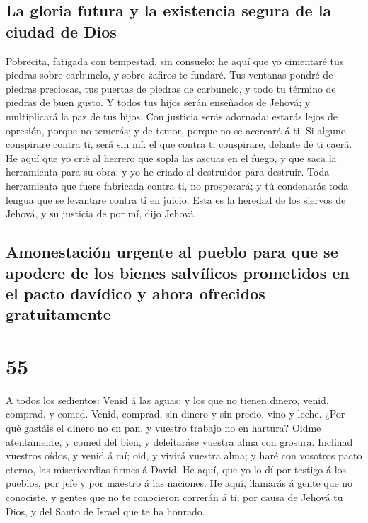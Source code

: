 \hypertarget{la-gloria-futura-y-la-existencia-segura-de-la-ciudad-de-dios}{%
\subsection{La gloria futura y la existencia segura de la ciudad de
Dios}\label{la-gloria-futura-y-la-existencia-segura-de-la-ciudad-de-dios}}

 Pobrecita, fatigada con tempestad, sin consuelo; he aquí
que yo cimentaré tus piedras sobre carbunclo, y sobre zafiros te
fundaré.  Tus ventanas pondré de piedras preciosas, tus
puertas de piedras de carbunclo, y todo tu término de piedras de buen
gusto.  Y todos tus hijos serán enseñados de Jehová; y
multiplicará la paz de tus hijos.  Con justicia serás
adornada; estarás lejos de opresión, porque no temerás; y de temor,
porque no se acercará á ti.  Si alguno conspirare contra
ti, será sin mí: el que contra ti conspirare, delante de ti caerá.
 He aquí que yo crié al herrero que sopla las ascuas en
el fuego, y que saca la herramienta para su obra; y yo he criado al
destruidor para destruir.  Toda herramienta que fuere
fabricada contra ti, no prosperará; y tú condenarás toda lengua que se
levantare contra ti en juicio. Esta es la heredad de los siervos de
Jehová, y su justicia de por mí, dijo Jehová.

\hypertarget{amonestaciuxf3n-urgente-al-pueblo-para-que-se-apodere-de-los-bienes-salvuxedficos-prometidos-en-el-pacto-davuxeddico-y-ahora-ofrecidos-gratuitamente}{%
\subsection{Amonestación urgente al pueblo para que se apodere de los
bienes salvíficos prometidos en el pacto davídico y ahora ofrecidos
gratuitamente}\label{amonestaciuxf3n-urgente-al-pueblo-para-que-se-apodere-de-los-bienes-salvuxedficos-prometidos-en-el-pacto-davuxeddico-y-ahora-ofrecidos-gratuitamente}}

\hypertarget{section-23-55}{%
\section{55}\label{section-23-55}}

 A todos los sedientos: Venid á las aguas; y los que no
tienen dinero, venid, comprad, y comed. Venid, comprad, sin dinero y sin
precio, vino y leche.  ¿Por qué gastáis el dinero no en
pan, y vuestro trabajo no en hartura? Oidme atentamente, y comed del
bien, y deleitaráse vuestra alma con grosura.  Inclinad
vuestros oídos, y venid á mí; oid, y vivirá vuestra alma; y haré con
vosotros pacto eterno, las misericordias firmes á David. 
He aquí, que yo lo dí por testigo á los pueblos, por jefe y por maestro
á las naciones.  He aquí, llamarás á gente que no
conociste, y gentes que no te conocieron correrán á ti; por causa de
Jehová tu Dios, y del Santo de Israel que te ha honrado.

